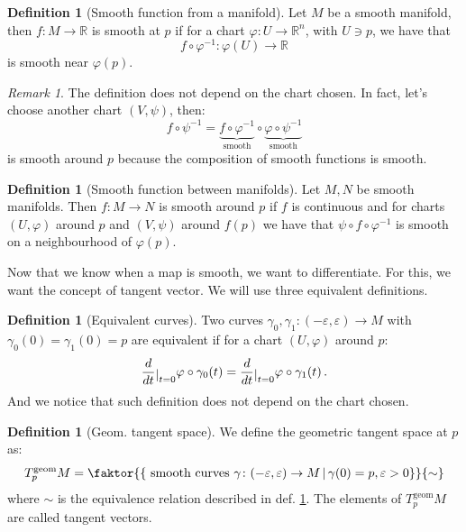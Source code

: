 \documentclass[a4paper,11pt,titlepage, article, oneside]{memoir}
\numberwithin{equation}{section}
\theoremstyle{definition}
\newtheorem{definition}[theorem]{Definition}
\theoremstyle{remark}
\newtheorem{remark}[theorem]{Remark}
\newcommand{\rfield}{\mathbb{R}}
\newcommand{\restrict}[2]{{#1}\raisebox{-.5ex}{$|$}_{#2}}
\newcommand{\diondi}[1]{\frac{d}{d{#1}}}
\newcommand{\tangentgeom}[1]{T_{#1}^{\text{geom}}}
\begin{document}
\begin{definition}[Smooth function from a manifold]
Let $M$ be a smooth manifold, then $f \colon M \rightarrow \rfield $ is smooth at $p$ if for a chart $\varphi \colon U \rightarrow \rfield^n$, with $U \ni p$, we have that
$$f \circ \varphi^{-1} \colon \varphi(U) \rightarrow \rfield$$
is smooth near $\varphi(p)$.
\end{definition}

\begin{remarkbox}
\begin{remark}
The definition does not depend on the chart chosen. In fact, let's choose another chart $(V, \psi)$, then:
$$f \circ \psi^{-1} = \underbrace{f \circ \varphi^{-1}}_{\text{smooth}} \circ \underbrace{\varphi \circ \psi^{-1}}_{\text{smooth}}$$
is smooth around $p$ because the composition of smooth functions is smooth.
\end{remark}
\end{remarkbox}

\begin{definition}[Smooth function between manifolds]
Let $M, N$ be smooth manifolds. Then $f \colon M \rightarrow N$ is smooth around $p$ if $f$ is continuous and for charts $(U, \varphi)$ around $p$ and $(V, \psi)$ around $f(p)$ we have that $\psi \circ f \circ \varphi^{-1}$ is smooth on a neighbourhood of $\varphi(p)$.
\end{definition}

Now that we know when a map is smooth, we want to differentiate. For this, we want the concept of tangent vector. We will use three equivalent definitions.

\begin{definition}[Equivalent curves] \label{equivcurves}
Two curves $\gamma_0, \gamma_1 \colon (-\varepsilon, \varepsilon) \rightarrow M$ with $\gamma_0(0)=\gamma_1(0)=p$ are equivalent if for a chart $(U, \varphi)$ around $p$:
\begin{equation*}
\restrict{\diondi{t}}{t=0} \varphi \circ \gamma_0(t) = \restrict{\diondi{t}}{t=0} \varphi \circ \gamma_1(t) \, .
\end{equation*}
And we notice that such definition does not depend on the chart chosen.
\end{definition}

\begin{definition}[Geom. tangent space] \label{geomtangent}
We define the geometric tangent space at $p$ as:
\begin{equation}
\tangentgeom{p} M = \faktor{
\left \{ \text{ smooth curves } \gamma \colon (-\varepsilon, \varepsilon) \rightarrow M \, | \, \gamma(0) = p, \varepsilon > 0 \right \}}
{\sim}
\end{equation}
where $\sim$ is the equivalence relation described in def. \ref{equivcurves}. The elements of $\tangentgeom{p} M$ are called tangent vectors.
\end{definition}
\end{document}
